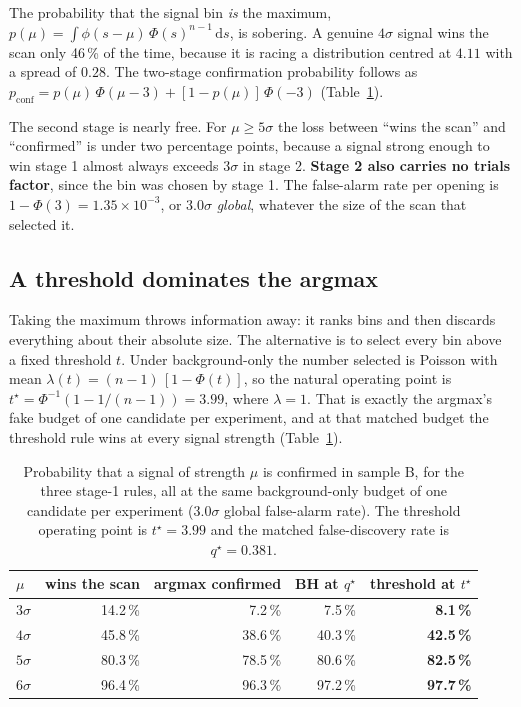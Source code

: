 The probability that the signal bin \emph{is} the maximum, $p(\mu) = \int
\phi(s-\mu)\,\Phi(s)^{n-1}\,\mathrm{d}s$, is sobering. A genuine $4\sigma$ signal wins the scan
only 46\,\% of the time, because it is racing a distribution centred at $4.11$ with a spread of
$0.28$. The two-stage confirmation probability follows as
$p_{\mathrm{conf}} = p(\mu)\,\Phi(\mu - 3) + [1-p(\mu)]\,\Phi(-3)$ (Table~\ref{tab:rules}).

The second stage is nearly free. For $\mu \ge 5\sigma$ the loss between ``wins the scan'' and
``confirmed'' is under two percentage points, because a signal strong enough to win stage 1 almost
always exceeds $3\sigma$ in stage 2. \textbf{Stage 2 also carries no trials factor}, since the bin
was chosen by stage 1. The false-alarm rate per opening is $1-\Phi(3) = 1.35\times10^{-3}$, or
$3.0\sigma$ \emph{global}, whatever the size of the scan that selected it.

\subsection{A threshold dominates the argmax}

Taking the maximum throws information away: it ranks bins and then discards everything about their
absolute size. The alternative is to select every bin above a fixed threshold $t$. Under
background-only the number selected is Poisson with mean $\lambda(t) = (n-1)\,[1-\Phi(t)]$, so the
natural operating point is $t^\star = \Phi^{-1}(1 - 1/(n-1)) = 3.99$, where $\lambda = 1$. That is
exactly the argmax's fake budget of one candidate per experiment, and at that matched budget the
threshold rule wins at every signal strength (Table~\ref{tab:rules}).

\begin{table}[htbp]
\centering
\caption{Probability that a signal of strength $\mu$ is confirmed in sample B, for the three
stage-1 rules, all at the same background-only budget of one candidate per experiment
($3.0\sigma$ global false-alarm rate). The threshold operating point is $t^\star = 3.99$ and the
matched false-discovery rate is $q^\star = 0.381$.}
\label{tab:rules}
\begin{tabular}{lrrrr}
\toprule
$\mu$ & wins the scan & argmax confirmed & BH at $q^\star$ & threshold at $t^\star$ \\
\midrule
$3\sigma$ & 14.2\,\% & 7.2\,\% & 7.5\,\% & \textbf{8.1\,\%} \\
$4\sigma$ & 45.8\,\% & 38.6\,\% & 40.3\,\% & \textbf{42.5\,\%} \\
$5\sigma$ & 80.3\,\% & 78.5\,\% & 80.6\,\% & \textbf{82.5\,\%} \\
$6\sigma$ & 96.4\,\% & 96.3\,\% & 97.2\,\% & \textbf{97.7\,\%} \\
\bottomrule
\end{tabular}
\end{table}

